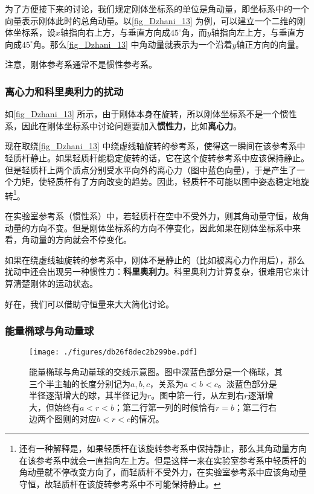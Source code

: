 为了方便接下来的讨论，我们规定刚体坐标系的单位是角动量，即坐标系中的一个向量表示刚体此时的总角动量。以\autoref{fig_Dzhani_13} 为例，可以建立一个二维的刚体坐标系，设$x$轴指向右上方，与垂直方向成$45^\circ$角，而$y$轴指向左上方，与垂直方向成$45^\circ$角。那么\autoref{fig_Dzhani_13} 中角动量就表示为一个沿着$y$轴正方向的向量。


注意，刚体参考系通常不是惯性参考系。




\subsubsection{离心力和科里奥利力的扰动}




如\autoref{fig_Dzhani_13} 所示，由于刚体本身在旋转，所以刚体坐标系不是一个惯性系，因此在刚体坐标系中讨论问题要加入\textbf{惯性力}，比如\textbf{离心力}。

现在取绕\autoref{fig_Dzhani_13} 中绕虚线轴旋转的参考系，使得这一瞬间在该参考系中轻质杆静止。如果轻质杆能稳定旋转的话，它在这个旋转参考系中应该保持静止。但是轻质杆上两个质点分别受水平向外的离心力（图中蓝色向量），于是产生了一个力矩，使轻质杆有了方向改变的趋势。因此，轻质杆不可能以图中姿态稳定地旋转\footnote{还有一种解释是，如果轻质杆在该旋转参考系中保持静止，那么其角动量方向在该参考系中就会一直指向左上方。但是这样一来在实验室参考系中轻质杆的角动量就不停改变方向了，而轻质杆不受外力，在实验室参考系中应该角动量守恒，故轻质杆在该旋转参考系中不可能保持静止。}。

在实验室参考系（惯性系）中，若轻质杆在空中不受外力，则其角动量守恒，故角动量的方向不变。但是刚体坐标系的方向不停变化，因此如果在刚体坐标系中来看，角动量的方向就会不停变化。


如果在绕虚线轴旋转的参考系中，刚体不是静止的（比如被离心力作用后），那么扰动中还会出现另一种惯性力：\textbf{科里奥利力}。科里奥利力计算复杂，很难用它来计算清楚刚体的运动状态。


好在，我们可以借助守恒量来大大简化讨论。








\subsubsection{能量椭球与角动量球}


\begin{figure}[ht]
\centering
\texttt{[image: ./figures/db26f8dec2b299be.pdf]}
\caption{能量椭球与角动量球的交线示意图。图中深蓝色部分是一个椭球，其三个半主轴的长度分别记为$a, b, c$，关系为$a<b<c$。淡蓝色部分是半径逐渐增大的球，其半径记为$r$。图中第一行，从左到右$r$逐渐增大，但始终有$a<r<b$；第二行第一列的时候恰有$r=b$；第二行右边两个图则的对应$b<r<c$的情况。} \label{fig_Dzhani_7}
\end{figure}



